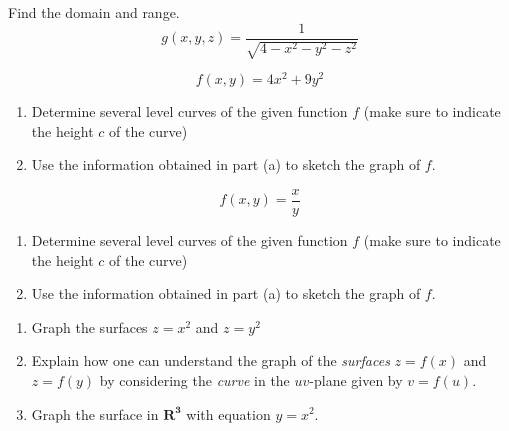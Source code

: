 \documentclass[12pt,letterpaper]{hmcpset}
\begin{document}

\begin{problem}[2.1.6]
	Find the domain and range.
  \[
    g(x, y, z) = \dfrac{1}{\sqrt{4 - x^2 - y^2 - z^2}}
  \]
\end{problem}

\begin{solution}
\vfill
\end{solution}
\newpage

\begin{problem}[2.1.18]
  \[
    f(x, y) = 4x^2 + 9y^2
  \]
	\begin{enumerate}
	  \item Determine several level curves of the given function $f$ (make sure to indicate the height $c$ of the curve)
    \item Use the information obtained in part (a) to sketch the graph of $f$.
	\end{enumerate}
\end{problem}

\begin{solution}
\vfill
\end{solution}
\newpage

\begin{problem}[2.1.21]
  \[
    f(x, y) = \dfrac{x}{y}
  \]
	\begin{enumerate}
	  \item Determine several level curves of the given function $f$ (make sure to indicate the height $c$ of the curve)
    \item Use the information obtained in part (a) to sketch the graph of $f$.
	\end{enumerate}
\end{problem}

\begin{solution}
\vfill
\end{solution}
\newpage

\begin{problem}[2.1.29]
\begin{enumerate}
  \item Graph the surfaces $z = x^2$ and $z = y^2$
  \item Explain how one can understand the graph of the \emph{surfaces} $z = f(x)$ and $z = f(y)$ by considering the \emph{curve} in the $uv$-plane given by $v = f(u)$.
  \item Graph the surface in $\mathbf{R^3}$ with equation $y=x^2$.
\end{enumerate}
\end{problem}
\end{document}
